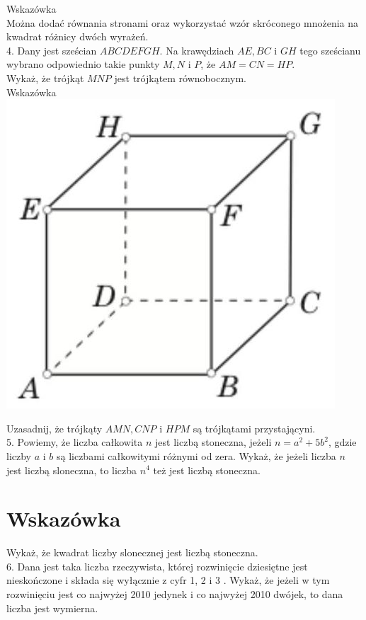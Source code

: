 \documentclass[10pt]{article}
\begin{document}
Wskazówka\\
Można dodać równania stronami oraz wykorzystać wzór skróconego mnożenia na kwadrat różnicy dwóch wyrażeń.\\
4. Dany jest sześcian \(A B C D E F G H\). Na krawędziach \(A E, B C\) i \(G H\) tego sześcianu wybrano odpowiednio takie punkty \(M, N\) i \(P\), że \(A M=C N=H P\).\\
Wykaż, że trójkąt \(M N P\) jest trójkątem równobocznym.\\
Wskazówka\\
\includegraphics[max width=\textwidth, center]{2024_11_21_8b84130892fdf090117bg-1}

Uzasadnij, że trójkąty \(A M N, C N P\) i \(H P M\) są trójkątami przystającyni.\\
5. Powiemy, że liczba całkowita \(n\) jest liczbą stoneczna, jeżeli \(n=a^{2}+5 b^{2}\), gdzie liczby \(a\) i \(b\) są liczbami całkowitymi różnymi od zera. Wykaż, że jeżeli liczba \(n\) jest liczbą sloneczna, to liczba \(n^{4}\) też jest liczbą stoneczna.

\section*{Wskazówka}
Wykaż, że kwadrat liczby slonecznej jest liczbą stoneczna.\\
6. Dana jest taka liczba rzeczywista, której rozwinięcie dziesiętne jest nieskończone i składa się wyłącznie z cyfr 1, 2 i 3 . Wykaż, że jeżeli w tym rozwinięciu jest co najwyżej 2010 jedynek i co najwyżej 2010 dwójek, to dana liczba jest wymierna.
\end{document}
